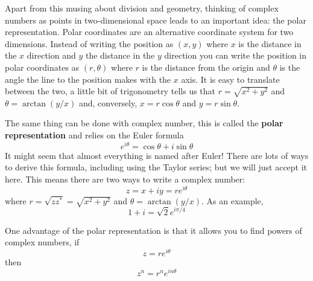 \documentclass[12pt]{article}
\begin{document}
Apart from this musing about division and geometry, thinking of
complex numbers as points in two-dimensional space leads to an
important idea: the polar representation. Polar coordinates are an
alternative coordinate system for two dimensions. Instead of writing
the position as $(x,y)$ where $x$ is the distance in the $x$ direction
and $y$ the distance in the $y$ direction you can write the position
in polar coordinates as $(r,\theta)$ where $r$ is the distance from
the origin and $\theta$ is the angle the line to the position makes
with the $x$ axis. It is easy to translate between the two, a little bit of trigonometry tells us that $r=\sqrt{x^2+y^2}$ and $\theta=\arctan{(y/x)}$ and, conversely, $x=r\cos{\theta}$ and $y=r\sin{\theta}$.

The same thing can be done with complex number, this is called the \textbf{polar representation} and relies on the Euler formula
\begin{equation}
  e^{i\theta}=\cos{\theta}+i\sin{\theta}
\end{equation}
It might seem that almost everything is named after Euler! There are
lots of ways to derive this formula, including using the Taylor
series; but we will just accept it here. This means there are two ways
to write a complex number:
\begin{equation}
  z=x+iy = re^{i\theta}
\end{equation}
where $r=\sqrt{zz^*}=\sqrt{x^2+y^2}$ and $\theta=\arctan{(y/x)}$. As an example, \begin{equation}
  1+i=\sqrt{2}e^{i\pi/4}
\end{equation}

One advantage of the polar representation is that it allows you to find powers of complex numbers, if
\begin{equation}
  z=re^{i\theta}
\end{equation}
then
\begin{equation}
  z^n=r^ne^{in\theta}
\end{equation}
\end{document}
